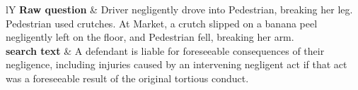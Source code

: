 \begin{table}[t]
\centering
\caption{What \hyre{} writes for one BarExam item (\texttt{mbe\_1175},
Gemma 4 26B). The raw question is a fact pattern; the \hyre{} search text is a
short doctrinal passage that names the controlling rule.}
\label{tab:query_contrast}
\footnotesize
\begin{tabularx}{\columnwidth}{lY}
\toprule
\textbf{Raw question} &
Driver negligently drove into Pedestrian, breaking her leg. Pedestrian used
crutches. At Market, a crutch slipped on a banana peel negligently left on the
floor, and Pedestrian fell, breaking her arm. \\
\addlinespace
\textbf{\hyre{} search text} &
A defendant is liable for foreseeable consequences of their negligence,
including injuries caused by an intervening negligent act if that act was a
foreseeable result of the original tortious conduct. \\
\bottomrule
\end{tabularx}
\end{table}
